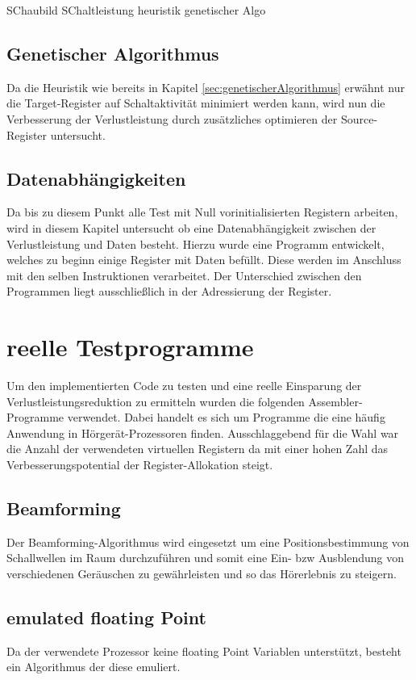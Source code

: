 SChaubild SChaltleistung heuristik genetischer Algo

\subsection{Genetischer Algorithmus}
Da die Heuristik wie bereits in Kapitel \ref{sec:genetischerAlgorithmus} erwähnt nur die Target-Register auf Schaltaktivität minimiert werden kann, wird nun die Verbesserung der Verlustleistung durch zusätzliches optimieren der Source-Register untersucht. 

\subsection{Datenabhängigkeiten}
Da bis zu diesem Punkt alle Test mit Null vorinitialisierten Registern arbeiten, wird in diesem Kapitel untersucht ob eine Datenabhängigkeit zwischen der Verlustleistung und Daten besteht. Hierzu wurde eine Programm entwickelt, welches zu beginn einige Register mit Daten befüllt. Diese werden im Anschluss mit den selben Instruktionen verarbeitet. Der Unterschied zwischen den Programmen liegt ausschließlich in der Adressierung der Register.  

\section{reelle Testprogramme}
\label{sec:testprogamme}
Um den implementierten Code zu testen und eine reelle Einsparung der Verlustleistungsreduktion zu ermitteln wurden die folgenden Assembler-Programme verwendet. Dabei handelt es sich um Programme die eine häufig Anwendung in Hörgerät-Prozessoren finden. Ausschlaggebend für die Wahl war die Anzahl der verwendeten virtuellen Registern da mit einer hohen Zahl das Verbesserungspotential der Register-Allokation steigt.
\subsection{Beamforming}
Der Beamforming-Algorithmus wird eingesetzt um eine Positionsbestimmung von Schallwellen im Raum durchzuführen und somit eine Ein- bzw Ausblendung von verschiedenen Geräuschen zu gewährleisten und so das Hörerlebnis zu steigern. 

\subsection{emulated floating Point}
Da der verwendete Prozessor keine floating Point Variablen unterstützt, besteht ein Algorithmus der diese emuliert. 




